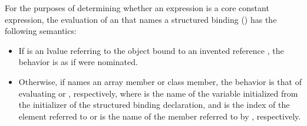 \documentclass{wg21}
\begin{document}

\begin{addedblock}
For the purposes of determining whether an expression is a core constant expression, the
evaluation of an  that names a structured binding  () has the
following semantics:
\begin{itemize}
\item If  is an lvalue referring to the object bound to an invented reference , the
behavior is as if  were nominated.
\item Otherwise, if  names an array member or class member, the behavior is that of
evaluating  or , respectively, where  is the name of the variable initialized
from the initializer of the structured binding declaration, and  is the index of the
element referred to or  is the name of the member referred to by , respectively.
\end{itemize}
\end{addedblock}

\end{document}

